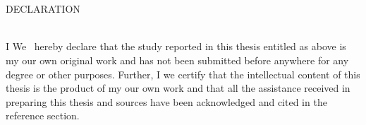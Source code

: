 \chapter*{\normalfont\MakeUppercase\thetitle}

\parbox{\textwidth}{\centering\MakeUppercase{Declaration}}\\[14pt]

%

\noindent\ifdefined\theStudyType I \else We~\fi
hereby declare that the study reported in this thesis entitled as above is 
\ifdefined\theStudyType my \else our \fi
own original work and has not been 
submitted before anywhere for any degree or other purposes. Further,
\ifdefined\theStudyType I \else we \fi
certify that the intellectual content of this thesis is the product of 
\ifdefined\theStudyType my \else our \fi own work and that all the assistance received in preparing this thesis and sources have been acknowledged and cited in the reference section.


\vspace{10ex}


